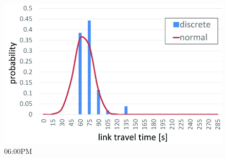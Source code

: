 \documentclass[t]{beamer}
\begin{document}
\begin{frame}
\begin{center}
\begin{figure}
		\includegraphics[scale=0.2]{ltt_1800.jpg}	
		\vspace{-0.05in}
		\\ 06:00PM
	\end{figure}
\end{center}

\end{frame}
\end{document}
